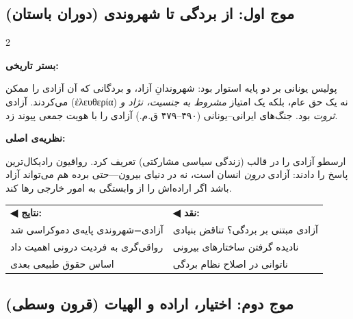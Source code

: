 \subsection{موج اول: از بردگی تا شهروندی (دوران باستان)}
\label{subsec:wave1}

\begin{tcolorbox}[mybox, title={موج اول | دوران باستان | \lr{500 BC -- 500 AD}},
  colframe=EraAncient, colback=EraAncient!5,
  boxed title style={colback=EraAncient}]

\begin{multicols}{2}

\textbf{\color{EraAncient}بستر تاریخی:}

پولیس یونانی بر دو پایه استوار بود: شهروندانِ آزاد، و بردگانی که آن آزادی را ممکن می‌کردند. آزادی (ἐλευθερία) نه یک حق عام، بلکه یک امتیاز \textit{مشروط به جنسیت، نژاد و ثروت} بود. جنگ‌های ایرانی–یونانی (۴۹۰–۴۷۹ ق.م.) آزادی را با هویت جمعی پیوند زد.

\columnbreak

\textbf{\color{EraAncient}نظریه‌ی اصلی:}

ارسطو آزادی را در قالب  (زندگی سیاسی مشارکتی) تعریف کرد. رواقیون رادیکال‌ترین پاسخ را دادند: آزادی \textit{درون} انسان است، نه در دنیای بیرون—حتی برده هم می‌تواند آزاد باشد اگر اراده‌اش را از وابستگی به امور خارجی رها کند.

\end{multicols}

\vspace{0.3cm}
\begin{tabular}{p{5cm}p{5cm}}
\textcolor{AccentGreen}{\textbf{◀ نتایج:}} & \textcolor{AccentRed}{\textbf{◀ نقد:}} \\
آزادی=شهروندی پایه‌ی دموکراسی شد & آزادی مبتنی بر بردگی؟ تناقض بنیادی \\
رواقی‌گری به فردیت درونی اهمیت داد & نادیده گرفتن ساختارهای بیرونی \\
اساس حقوق طبیعی بعدی & ناتوانی در اصلاح نظام بردگی \\
\end{tabular}

\end{tcolorbox}

\subsection{موج دوم: اختیار، اراده و الهیات (قرون وسطی)}
\label{subsec:wave2}


